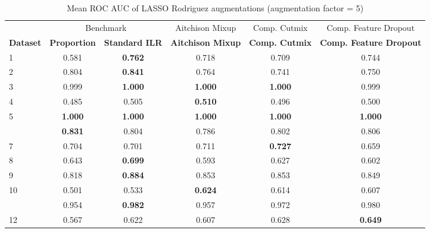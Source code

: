 \begin{table}[!h]
\centering
\caption{\label{tab:tab:rodriguez_lasso_mean_roc_auc_5}Mean ROC AUC of LASSO Rodriguez augmentations (augmentation factor = 5)}
\centering
\begin{tabular}[t]{lccccc}
\toprule
\multicolumn{1}{c}{ } & \multicolumn{2}{c}{Benchmark} & \multicolumn{1}{c}{Aitchison Mixup} & \multicolumn{1}{c}{Comp. Cutmix} & \multicolumn{1}{c}{Comp. Feature Dropout} \\
\cmidrule(l{3pt}r{3pt}){2-3} \cmidrule(l{3pt}r{3pt}){4-4} \cmidrule(l{3pt}r{3pt}){5-5} \cmidrule(l{3pt}r{3pt}){6-6}
\textbf{Dataset} & \textbf{Proportion} & \textbf{Standard ILR} & \textbf{Aitchison Mixup} & \textbf{Comp. Cutmix} & \textbf{Comp. Feature Dropout}\\
\midrule
1 & 0.581 & \textbf{0.762} & 0.718 & 0.709 & 0.744\\
2 & 0.804 & \textbf{0.841} & 0.764 & 0.741 & 0.750\\
3 & 0.999 & \textbf{1.000} & \textbf{1.000} & \textbf{1.000} & 0.999\\
4 & 0.485 & 0.505 & \textbf{0.510} & 0.496 & 0.500\\
5 & \textbf{1.000} & \textbf{1.000} & \textbf{1.000} & \textbf{1.000} & \textbf{1.000}\\
\addlinespace
6 & \textbf{0.831} & 0.804 & 0.786 & 0.802 & 0.806\\
7 & 0.704 & 0.701 & 0.711 & \textbf{0.727} & 0.659\\
8 & 0.643 & \textbf{0.699} & 0.593 & 0.627 & 0.602\\
9 & 0.818 & \textbf{0.884} & 0.853 & 0.853 & 0.849\\
10 & 0.501 & 0.533 & \textbf{0.624} & 0.614 & 0.607\\
\addlinespace
11 & 0.954 & \textbf{0.982} & 0.957 & 0.972 & 0.980\\
12 & 0.567 & 0.622 & 0.607 & 0.628 & \textbf{0.649}\\
\bottomrule
\end{tabular}
\end{table}
